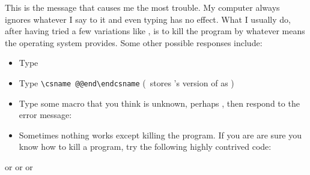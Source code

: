 \begin{plainlist}
    This is the message that causes me the most trouble. My computer
always ignores whatever I say to it and even typing \cmd{\end} has
no effect. What I usually do, after having tried a few variations
like , is to kill the program by whatever means the operating
system provides. Some other possible responses include:
\begin{itemize}
\item Type \cmd{\stop}
\item Type \verb?\csname @@end\endcsname? (\ltx\ stores \tx's version of
      \cmd{\end} as \cmd{\@@end})
\item Type some macro that you think is unknown, perhaps ,
      then respond to the error message: 
\item Sometimes nothing works except killing the program. If you are are sure you
      know how to kill a program, try the following highly contrived code:
\end{itemize}




\item[\textmess{!}]%
     or 
     or
     or 


\item[\textmess{!}]
      \\



\end{plainlist}
